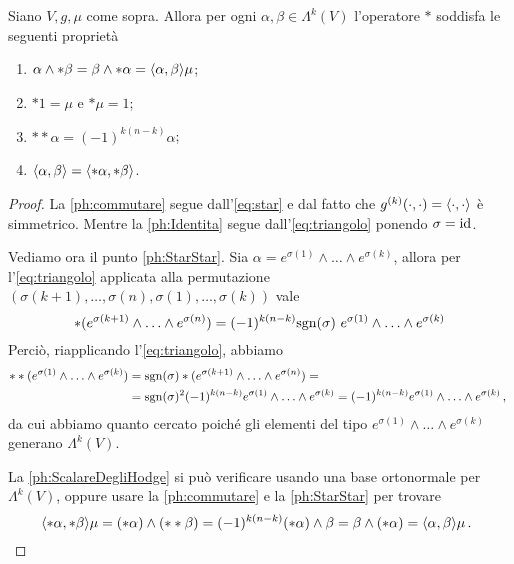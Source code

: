 \begin{proposition} \label{prop:ProprietaHodge}
	Siano $V,g,\mu$ come sopra. Allora per ogni $\alpha,\beta\in\Lambda^k(V)$ l'operatore $*$ soddisfa le seguenti proprietà
	\begin{enumerate}
		\item $\alpha\wedge *\beta = \beta \wedge * \alpha = \langle \alpha , \beta \rangle \mu$; \label{ph:commutare}
		\item $*1 = \mu$ e $*\mu=1$; \label{ph:Identita}
		\item $**\alpha = (-1)^{k(n-k)} \alpha$; \label{ph:StarStar}
		\item $\langle \alpha , \beta \rangle = \langle *\alpha , *\beta \rangle$. \label{ph:ScalareDegliHodge}
	\end{enumerate}
\end{proposition}
\begin{proof}
	La \ref{ph:commutare} segue dall'\cref{eq:star} e dal fatto che $g^{(k)}(\cdot,\cdot)=\langle \cdot , \cdot \rangle$ è simmetrico.
	Mentre la \ref{ph:Identita} segue dall'\cref{eq:triangolo} ponendo $\sigma = \mathrm{id}$.
	
	Vediamo ora il punto \ref{ph:StarStar}. Sia $\alpha = e^{\sigma(1)}\wedge \ldots \wedge e^{\sigma(k)}$, allora per l'\cref{eq:triangolo} applicata alla permutazione $(\sigma(k+1),\ldots,\sigma(n),\sigma(1),\ldots,\sigma(k))$ vale 
	\begin{equation*}
		*(e^{\sigma(k+1)} \wedge\ldots\wedge e^{\sigma(n)}) = (-1)^{k(n-k)}\mathrm{sgn}(\sigma) \ e^{\sigma(1)} \wedge\ldots\wedge e^{\sigma(k)}
	\end{equation*}
% 	
	Perciò, riapplicando l'\cref{eq:triangolo}, abbiamo
	\begin{align*}
	**(e^{\sigma(1)} \wedge\ldots\wedge e^{\sigma(k)}) &= \mathrm{sgn}(\sigma) * (e^{\sigma(k+1)} \wedge\ldots\wedge e^{\sigma(n)}) =\\
	&=\mathrm{sgn}(\sigma)^2 (-1)^{k(n-k)} e^{\sigma(1)} \wedge\ldots\wedge e^{\sigma(k)} = (-1)^{k(n-k)} e^{\sigma(1)} \wedge\ldots\wedge e^{\sigma(k)} \, \text{, }
	\end{align*}
	da cui abbiamo quanto cercato poiché gli elementi del tipo $e^{\sigma(1)}\wedge \ldots \wedge e^{\sigma(k)}$ generano $\Lambda^k(V)$.
	
	La \ref{ph:ScalareDegliHodge} si può verificare usando una base ortonormale per $\Lambda^k(V)$, oppure usare la \ref{ph:commutare} e la \ref{ph:StarStar} per trovare
	\begin{equation*}
		\langle *\alpha , *\beta \rangle \mu = (*\alpha) \wedge (**\beta) = (-1)^{k(n-k)} (*\alpha)\wedge\beta = \beta\wedge (*\alpha) = \langle \alpha , \beta \rangle \mu\, \text{. }
	\end{equation*}
\end{proof}


